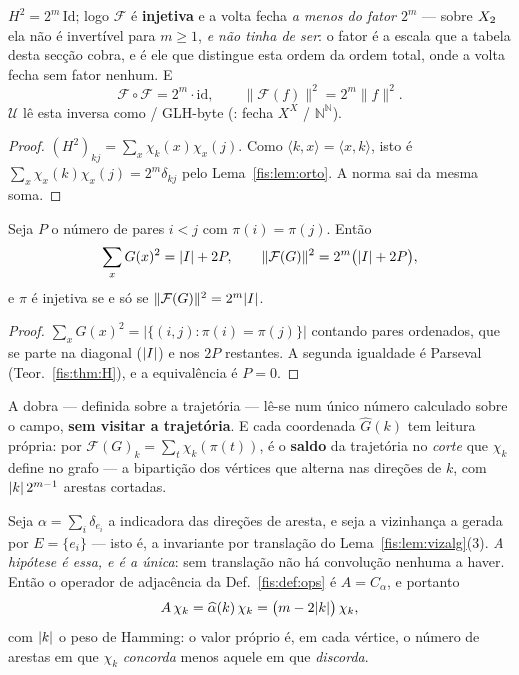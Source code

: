 \documentclass[livro.tex]{subfiles}
\begin{document}
\begin{teorema}\label{fis:thm:H}
$H^{2}=2^{m}\,\mathrm{Id}$; logo $\mathcal{F}$ é \textbf{injetiva} e a volta
fecha \emph{a menos do fator $2^{m}$} --- sobre $X_2$ ela não é invertível para
$m\ge1$, \emph{e não tinha de ser}: o fator é a escala que a tabela desta secção
cobra, e é ele que distingue esta ordem da ordem total, onde a volta fecha sem
fator nenhum. E\[
\mathcal{F}\circ \mathcal{F}=2^{m}\cdot\mathrm{id},\qquad
\lVert \mathcal{F}(f)\rVert^{2}=2^{m}\lVert f\rVert^{2}.
\]
\(\mathcal{U}\) lê esta inversa como  / GLH-byte
(: fecha \(X^{X}\) / \(\mathbb{N}^{\mathbb{N}}\)).
\end{teorema}

\begin{proof}
$(H^2)_{kj}=\sum_x\chi_k(x)\chi_x(j)$. Como $\langle k,x\rangle=\langle
x,k\rangle$, isto é $\sum_x\chi_x(k)\chi_x(j)=2^{m}\delta_{kj}$ pelo
Lema~\ref{fis:lem:orto}. A norma sai da mesma soma.
\end{proof}

\begin{teorema}\label{fis:thm:dobranorma}
Seja $P$ o número de pares $i<j$ com $\pi(i)=\pi(j)$. Então
\[
\sum_x G(x)^2=\lvert I\rvert+2P,
\qquad
\lVert \mathcal{F}(G)\rVert^{2}=2^{m}\bigl(\lvert I\rvert+2P\bigr),
\]
e $\pi$ é injetiva se e só se $\lVert \mathcal{F}(G)\rVert^{2}=2^{m}\lvert I\rvert$.
\end{teorema}

\begin{proof}
$\sum_x G(x)^2=\lvert\{(i,j):\pi(i)=\pi(j)\}\rvert$ contando pares ordenados, que
se parte na diagonal ($\lvert I\rvert$) e nos $2P$ restantes. A segunda igualdade é
Parseval (Teor.~\ref{fis:thm:H}), e a equivalência é $P=0$.
\end{proof}

\medskip\noindent A dobra --- definida sobre a trajetória --- lê-se num único
número calculado sobre o campo, \textbf{sem visitar a trajetória}. E cada
coordenada $\widehat{G}(k)$ tem leitura própria: por
$\mathcal{F}(G)_k=\sum_t\chi_k(\pi(t))$, é o \textbf{saldo} da trajetória no
\emph{corte} que $\chi_k$ define no grafo --- a bipartição dos vértices que
alterna nas direções de $k$, com $\lvert k\rvert\,2^{m-1}$ arestas cortadas.

\begin{corolario}\label{fis:cor:modos}
Seja $\alpha=\sum_{i}\delta_{e_i}$ a indicadora das direções de aresta, e seja a
vizinhança a gerada por $E=\{e_i\}$ --- isto é, a invariante por translação do
Lema~\ref{fis:lem:vizalg}(3). \emph{A hipótese é essa, e é a única}: sem
translação não há convolução nenhuma a haver. Então o operador de adjacência da
Def.~\ref{fis:def:ops} é $A=C_\alpha$, e portanto
\[
A\,\chi_k=\widehat{\alpha}(k)\,\chi_k=\bigl(m-2\lvert k\rvert\bigr)\,\chi_k ,
\]
com $\lvert k\rvert$ o peso de Hamming: o valor próprio é, em cada vértice, o número de
arestas em que $\chi_k$ \emph{concorda} menos aquele em que \emph{discorda}.
\end{corolario}
\end{document}
